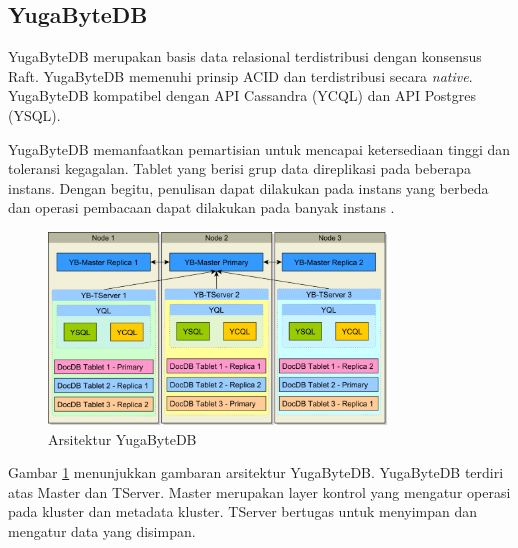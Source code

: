 \subsection{YugaByteDB}

YugaByteDB merupakan basis data relasional terdistribusi dengan konsensus Raft. YugaByteDB memenuhi prinsip ACID dan terdistribusi secara \textit{native}. YugaByteDB kompatibel dengan API Cassandra (YCQL) dan API Postgres (YSQL).

YugaByteDB memanfaatkan pemartisian untuk mencapai ketersediaan tinggi dan toleransi kegagalan. Tablet yang berisi grup data direplikasi pada beberapa instans. Dengan begitu, penulisan dapat dilakukan pada instans yang berbeda dan operasi pembacaan dapat dilakukan pada banyak instans \parencite{yugabyteBaeldung}.

\begin{figure}[htbp]
    \centering
    \includegraphics[width=0.8\textwidth]{resources/chapter-2/yugabyte.png}
    \caption{Arsitektur YugaByteDB \parencite{yugabyteBaeldung}}
    \label{fig:yugabyte-architecture}
\end{figure}

Gambar \ref{fig:yugabyte-architecture} menunjukkan gambaran arsitektur YugaByteDB. YugaByteDB terdiri atas Master dan TServer. Master merupakan layer kontrol yang mengatur operasi pada kluster dan metadata kluster. TServer bertugas untuk menyimpan dan mengatur data yang disimpan.
